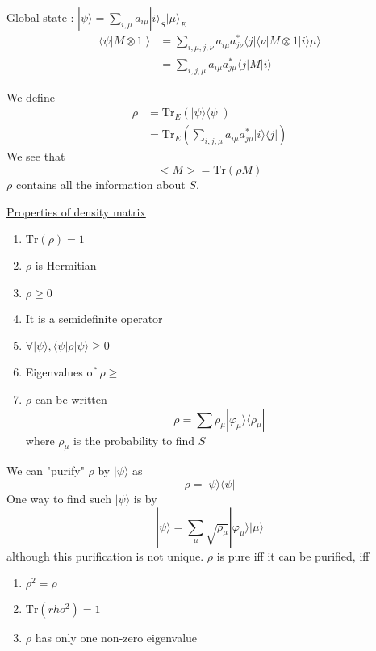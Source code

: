 \documentclass[a4paper]{book}
\theoremstyle{definition}
\theoremstyle{remark}
\begin{document}
Global state : $|\psi\rangle = \sum_{i, \mu} a_{i\mu}|i\rangle_S|\mu\rangle_E$
\begin{equation}
    \begin{aligned}
        \langle\psi |M\otimes 1 | \rangle &= \sum_{i, \mu, j, \nu} a_{i\mu}a^*_{j\nu}\langle j|\langle \nu|M \otimes 1 |i \rangle \mu \rangle  \\
        &= \sum_{i, j, \mu} a_{i\mu}a^*_{j\mu}\langle j|M|i\rangle 
    \end{aligned}
\end{equation}

We define 
\begin{equation}
    \begin{aligned}
        \rho &= \text{Tr}_E(|\psi \rangle \langle \psi |) \\
        &= \text{Tr}_E(\sum_{i, j, \mu} a_{i\mu}a^*_{j\mu}|i\rangle\langle j| )
    \end{aligned}
\end{equation}
We see that 
\begin{equation}
    <M> = \text{Tr}(\rho M)
\end{equation}
$\rho$ contains all the information about $S$. \par \bigskip 

\underline{Properties of density matrix}
\begin{enumerate}
    \item $\text{Tr}(\rho) = 1$
    \item $\rho$ is Hermitian
    \item $\rho \geq 0$
    \item It is a semidefinite operator 
    \item $\forall |\psi\rangle, \langle\psi|\rho|\psi \rangle \geq 0$
    \item Eigenvalues of $\rho \geq$ 
    \item $\rho$ can be written 
    \begin{equation}
        \rho = \sum \rho_\mu |\varphi_\mu \rangle \langle \rho_\mu | 
    \end{equation}
    where $\rho_\mu$ is the probability to find $S$
\end{enumerate}

We can "purify" $\rho$ by $|\psi\rangle $ as 
\begin{equation}
    \rho = |\psi\rangle\langle \psi |
\end{equation}
One way to find such $|\psi\rangle$ is by 
\begin{equation}
    |\psi\rangle = \sum_\mu \sqrt{\rho_\mu} |\varphi_\mu\rangle |\mu\rangle 
\end{equation}
although this purification is not unique.\newline 
$\rho$ is pure iff it can be purified, iff  
\begin{enumerate}
    \item $\rho^2 = \rho$
    \item $\text{Tr}(rho^2) = 1$
    \item $\rho$ has only one non-zero eigenvalue  
\end{enumerate}
\end{document}
